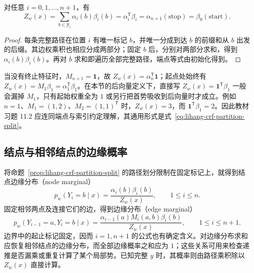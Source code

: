 \begin{proposition}
\label{prop:lihang-crf-partition-split}
对任意 $i=0,1,\ldots,n+1$，有
\begin{equation}
\label{eq:lihang-crf-partition-split}
  Z_w(x)=\sum_{b\in\mathcal Y_i}\alpha_i(b)\beta_i(b)
        =\alpha_i^{\mathsf T}\beta_i
        =\alpha_{n+1}(\mathrm{stop})=\beta_0(\mathrm{start}).
\end{equation}
\end{proposition}
\begin{proof}
每条完整路径在位置 $i$ 有唯一标记 $b$，并唯一分成到达 $b$ 的前缀和从 $b$ 出发的后缀。其边权乘积也相应分成两部分；固定 $b$ 后，分别对两部分求和，得到 $\alpha_i(b)\beta_i(b)$。再对 $b$ 求和即遍历全部完整路径，端点等式由初始化得到。
\end{proof}

\begin{notealert}[type=caution,title={首尾势与教材习题 11.2 的边界式}]
当没有终止特征时，$M_{n+1}=\mathbf1$，故 $Z_w(x)=\alpha_n^{\mathsf T}\mathbf1$；起点处始终有 $Z_w(x)=M_1\beta_1=\alpha_1^{\mathsf T}\beta_1$。在本节的后向量定义下，直接写 $Z_w(x)=\mathbf1^{\mathsf T}\beta_1$ 一般会漏掉 $M_1$，只有起始权重全为 $1$ 或另行把首势吸收到后向量时才成立。例如 $n=1$、$M_1=(1,2)$、$M_2=(1,1)^{\mathsf T}$ 时，$Z_w(x)=3$，而 $\mathbf1^{\mathsf T}\beta_1=2$。因此教材习题 11.2 应连同端点与索引约定理解，其通用形式是式~\eqref{eq:lihang-crf-partition-split}。
\end{notealert}

\subsection{结点与相邻结点的边缘概率}
\label{subsec:lihang-crf-marginals}

将命题~\ref{prop:lihang-crf-partition-split} 的路径划分限制在固定标记上，就得到结点边缘分布（node marginal）
\begin{equation}
\label{eq:lihang-crf-node-marginal}
  p_w(Y_i=b\mid x)=\frac{\alpha_i(b)\beta_i(b)}{Z_w(x)},\qquad 1\leq i\leq n.
\end{equation}
固定相邻两点及连接它们的边，得到边缘分布（edge marginal）
\begin{equation}
\label{eq:lihang-crf-edge-marginal}
  p_w(Y_{i-1}=a,Y_i=b\mid x)
  =\frac{\alpha_{i-1}(a)M_i(a,b)\beta_i(b)}{Z_w(x)},
  \qquad 1\leq i\leq n+1.
\end{equation}
边界中的起止标记固定，因而 $i=1,n+1$ 的公式也有确定含义。对边缘分布求和应恢复相邻结点的边缘分布，而全部边缘概率之和应为 $1$；这些关系可用来检查递推是否漏乘或重复计算了某个局部势。已知完整 $y$ 时，其概率则由路径乘积除以 $Z_w(x)$ 直接计算。

